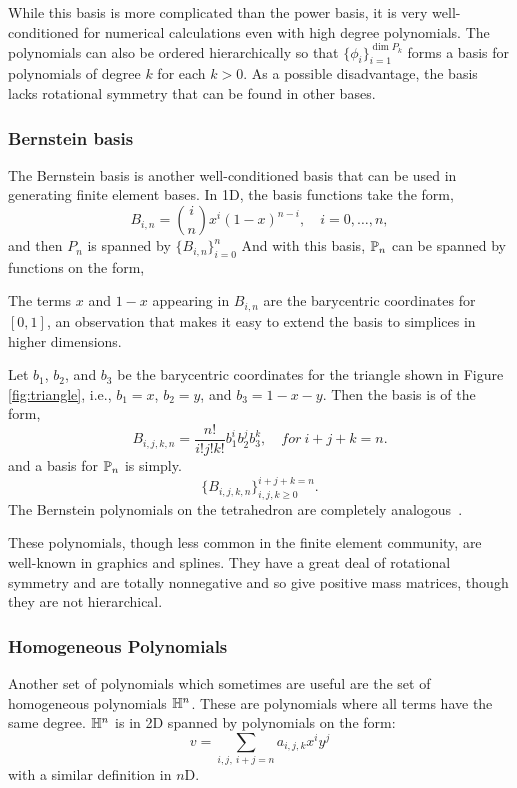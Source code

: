 While this basis is more complicated than the power basis, it is very
well-conditioned for numerical calculations even with high degree
polynomials.  The polynomials can also be ordered hierarchically so
that 
\( \{ \phi_i \}_{i=1}^{\dim P_k} \) forms a basis for  polynomials of
degree \( k \) for each \( k > 0 \).  As a possible disadvantage, the
basis lacks rotational symmetry that can be found in  other bases.

\subsubsection{Bernstein basis}
The Bernstein basis  is another well-conditioned basis that can be
used in generating finite element bases.
In 1D, the  basis functions take the  form,
\[
B_{i,n} = \binom{i}{n} x^i (1-x)^{n-i}, \quad i=0,\ldots,n,
\]
and then \( P_n \) is spanned by \( \{ B_{i,n} \}_{i=0}^n \)
And with this basis, $\P_n$ can be spanned by functions on the form,

The terms \( x \) and \( 1-x \) appearing in \( B_{i,n} \) are the
barycentric coordinates for \( [0,1] \), an observation that makes it
easy to extend the basis to simplices in higher dimensions.

Let $b_1$, $b_2$, and $b_3$ be the barycentric coordinates for
the triangle shown in Figure \ref{fig:triangle}, i.e., 
$b_1=x$, $b_2=y$, and $b_3=1-x-y$. Then the basis is
of the form,
\[
B_{i,j,k,n} = \frac{n!}{i!j!k!} b_1^i b_2^j b_3^k, \quad  for \ i+j+k=n .
\]
and a basis for $\P_n$ is simply.
\[
\{ B_{i,j,k,n} \}_{i,j,k\geq 0}^{i+j+k = n} .
\]
The Bernstein polynomials on the tetrahedron are completely
analogous~\cite{Schumaker}.
 
These polynomials, though less common in the finite element community,
are well-known in graphics and splines.  They have a great deal of
rotational symmetry and are totally nonnegative and so give positive
mass matrices, though they are not hierarchical. 

\subsubsection{Homogeneous Polynomials}
\label{sec:homo:pol}

Another set of polynomials which sometimes are useful are the set
of homogeneous polynomials $\H^n$. These are polynomials where all terms
have the same degree. $\H^n$ is in 2D spanned by polynomials on the
form:
\[
v = \sum_{i,j, \ i+j=n}
a_{i,j,k} x^i y^j
\]
with a similar definition in $n$D. 



